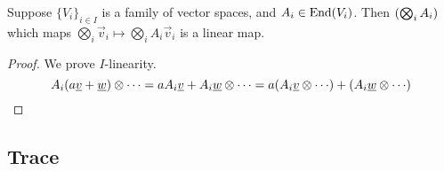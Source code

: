 \begin{proposition}
    Suppose \({\{V_i\}}_{i \in I}\) is a family of vector spaces,
    and \(A_i \in \operatorname{End}(V_i)\).
    Then \(\pqty{\bigotimes_i A_i}\)
    which maps \(\bigotimes_i \vec{v}_i \mapsto \bigotimes_i A_i\vec{v}_i\) is a linear map.
\end{proposition}
\begin{proof}
    We prove \(I\)-linearity.
    \begin{equation*}
        A_i(a\vec{v}+\vec{w}) \otimes \cdots
        = a A_i\vec{v} + A_i\vec{w} \otimes \cdots
        = a \pqty{A_i\vec{v} \otimes \cdots} + \pqty{A_i\vec{w} \otimes \cdots}
    \end{equation*}
\end{proof}

\subsection*{Trace}

